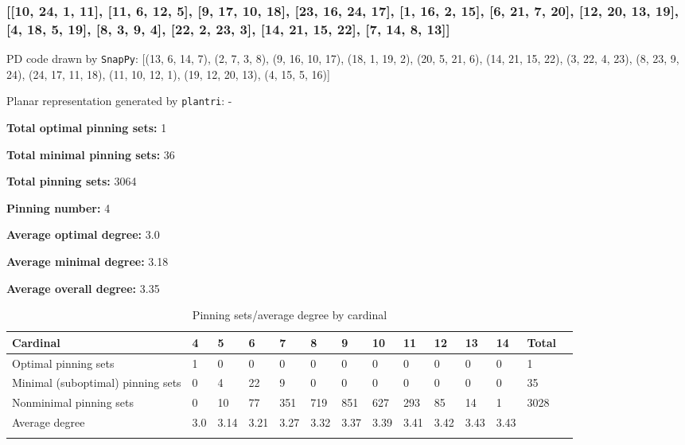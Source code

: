 \documentclass{article}%
\begin{document}
\subsubsection{[[10, 24, 1, 11], [11, 6, 12, 5], [9, 17, 10, 18], [23, 16, 24, 17], [1, 16, 2, 15], [6, 21, 7, 20], [12, 20, 13, 19], [4, 18, 5, 19], [8, 3, 9, 4], [22, 2, 23, 3], [14, 21, 15, 22], [7, 14, 8, 13]]}

{\small\noindent PD code drawn by \texttt{SnapPy}: [(13, 6, 14, 7), (2, 7, 3, 8), (9, 16, 10, 17), (18, 1, 19, 2), (20, 5, 21, 6), (14, 21, 15, 22), (3, 22, 4, 23), (8, 23, 9, 24), (24, 17, 11, 18), (11, 10, 12, 1), (19, 12, 20, 13), (4, 15, 5, 16)]}

{\small\noindent Planar representation generated by \texttt{plantri}: -}

\begin{multicols}{2}
{\normalsize \noindent\textbf{Total optimal pinning sets:} 1

\noindent\textbf{Total minimal pinning sets:} 36

\noindent\textbf{Total pinning sets:} 3064

\noindent\textbf{Pinning number:} 4

}
\columnbreak

{\normalsize \noindent\textbf{Average optimal degree:} 3.0

\noindent\textbf{Average minimal degree:} 3.18

\noindent\textbf{Average overall degree:} 3.35

}
\end{multicols}

\begin{table}[ht]
	\caption{Pinning sets/average degree by cardinal}
	\centering
	\renewcommand{\arraystretch}{1.5}
	\begin{tabularx}{\textwidth}{lXXXXXXXXXXXXX}
		\toprule
			Cardinal & 4 & 5 & 6 & 7 & 8 & 9 & 10 & 11 & 12 & 13 & 14 & Total\\
			\hline
			Optimal pinning sets & 1 & 0 & 0 & 0 & 0 & 0 & 0 & 0 & 0 & 0 & 0 & 1 \\
			Minimal (suboptimal) pinning sets & 0 & 4 & 22 & 9 & 0 & 0 & 0 & 0 & 0 & 0 & 0 & 35 \\
			Nonminimal pinning sets & 0 & 10 & 77 & 351 & 719 & 851 & 627 & 293 & 85 & 14 & 1 & 3028 \\
			Average degree & 3.0 & 3.14 & 3.21 & 3.27 & 3.32 & 3.37 & 3.39 & 3.41 & 3.42 & 3.43 & 3.43 &  \\
		\bottomrule \\ 
	\end{tabularx}
\end{table}
\end{document}
